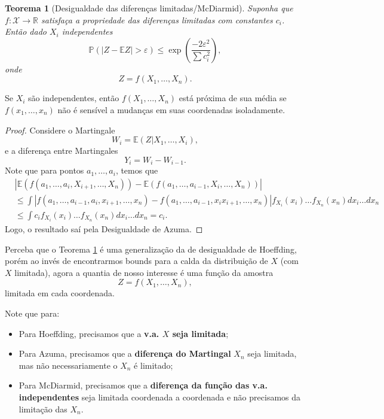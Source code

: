 \documentclass[12pt,a4paper,oneside]{book}
\newtheorem{theorem}{Teorema}[section]
\theoremstyle{definition}
\theoremstyle{remark}
\numberwithin{equation}{section}
\newcommand{\R}{\mathbb{R}}
\newcommand{\e}{\varepsilon}
\newcommand{\E}{\mathbb{E}}
\newcommand{\pr}{\mathbb{P}}
\begin{document}
\begin{theorem}[Desigualdade das diferenças limitadas/McDiarmid]\label{des-difflimitd} Suponha que $f:\mathcal{X}\rightarrow \R$ satisfaça a propriedade das diferenças limitadas com constantes $c_i$. Então dado $X_i$ independentes
$$\pr (|Z-\E Z|>\e) \leq \exp\left(  \dfrac{-2\e^2}{\sum c_i^2}     \right), $$
onde 
$$Z = f(X_1,\dots,X_n). $$
\end{theorem}

\begin{tcolorbox}[colback = yellow!60]
Se $X_i$ são independentes, então $f(X_1,\dots,X_n)$ está próxima de sua média se  $f(x_1,\dots,x_n)$ não é sensível a mudanças em suas coordenadas isoladamente.
\end{tcolorbox}


\begin{proof}
Considere o Martingale
$$W_i = \E(Z|X_1,\dots,X_i), $$
e a diferença entre Martingales
$$Y_i = W_i-W_{i-1}. $$
Note que para pontos $a_1,\dots,a_i$, temos que
\begin{align*}
&|\E(f(a_1,\dots,a_i,X_{i+1},\dots,X_n))-\E(f(a_1,\dots,a_{i-1},X_{i},\dots,X_n))|\\
&	\leq\int |f(a_1,\dots,a_{i-1},a_i,x_{i+1},\dots,x_n)-f(a_1,\dots,a_{i-1},x_{i}x_{i+1},\dots,x_n)|f_{X_i}(x_i)\dots f_{X_n}(x_n)dx_i\dots dx_n\\
&	\leq\int c_i f_{X_i}(x_i)\dots f_{X_n}(x_n)dx_i\dots dx_n = c_i.
\end{align*}
Logo, o resultado saí pela Desigualdade de Azuma.

\end{proof}


\begin{tcolorbox}[colback = yellow!60]
Perceba que o Teorema \ref{des-difflimitd} é uma generalização da de desigualdade de Hoeffding, porém ao invés de  encontrarmos bounds para a calda da distribuição de $X$ (com $X$ limitada), agora a quantia de nosso interesse é uma função da amostra 
$$Z = f(X_1,\dots,X_n), $$
limitada em cada coordenada.
\end{tcolorbox}

\begin{tcolorbox}[colback = yellow!60]
Note que para:
\begin{itemize}
\item Para Hoeffding, precisamos que a \textbf{v.a. $X$ seja limitada};
\item Para Azuma, precisamos que a \textbf{diferença do Martingal}  $X_n$ seja limitada, mas não necessariamente o $X_n$ é limitado;
\item Para McDiarmid, precisamos que a \textbf{diferença da função das v.a. independentes} seja limitada coordenada a coordenada e não precisamos da limitação das $X_n$.
\end{itemize} 
\end{tcolorbox}
\end{document}
